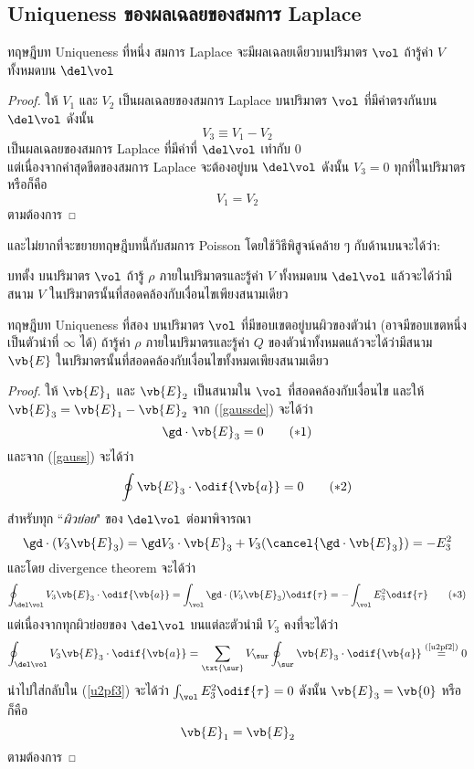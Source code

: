 \subsection{Uniqueness ของผลเฉลยของสมการ Laplace}
\begin{lawbox}{ทฤษฎีบท Uniqueness ที่หนึ่ง}
    สมการ Laplace จะมีผลเฉลยเดียวบนปริมาตร $\vol$ ถ้ารู้ค่า $V$ ทั้งหมดบน $\del\vol$
\end{lawbox}
\begin{proof}
    ให้ $V_1$ และ $V_2$ เป็นผลเฉลยของสมการ Laplace บนปริมาตร $\vol$ ที่มีค่าตรงกันบน $\del\vol$ ดังนั้น
    \[
    V_3\equiv V_1-V_2
    \]
    เป็นผลเฉลยของสมการ Laplace ที่มีค่าที่ $\del\vol$ เท่ากับ $0$\\
    แต่เนื่องจากค่าสุดขีดของสมการ Laplace จะต้องอยู่บน $\del\vol$ ดังนั้น $V_3=0$ ทุกที่ในปริมาตร หรือก็คือ
    \[
    V_1=V_2
    \]
    ตามต้องการ
\end{proof}
และไม่ยากที่จะขยายทฤษฎีบทนี้กับสมการ Poisson โดยใช้วิธีพิสูจน์คล้าย ๆ กับด้านบนจะได้ว่า:
\begin{corbox}{บทตั้ง}
    บนปริมาตร $\vol$ ถ้ารู้ $\rho$ ภายในปริมาตรและรู้ค่า $V$ ทั้งหมดบน $\del\vol$ แล้วจะได้ว่ามีสนาม $V$ ในปริมาตรนั้นที่สอดคล้องกับเงื่อนไขเพียงสนามเดียว
\end{corbox}

\begin{lawbox}{ทฤษฎีบท Uniqueness ที่สอง}
    บนปริมาตร $\vol$ ที่มีขอบเขตอยู่บนผิวของตัวนำ (อาจมีขอบเขตหนึ่งเป็นตัวนำที่ $\infty$ ได้) ถ้ารู้ค่า $\rho$ ภายในปริมาตรและรู้ค่า $Q$ ของตัวนำทั้งหมดแล้วจะได้ว่ามีสนาม $\vb{E}$ ในปริมาตรนั้นที่สอดคล้องกับเงื่อนไขทั้งหมดเพียงสนามเดียว
\end{lawbox}
\begin{proof}
    ให้ $\vb{E}_1$ และ $\vb{E}_2$ เป็นสนามใน $\vol$ ที่สอดคล้องกับเงื่อนไข และให้ $\vb{E}_3=\vb{E}_1-\vb{E}_2$ จาก (\ref{gaussde}) จะได้ว่า
    \begin{equation}
        \gd\cdot\vb{E}_3=0\tag{$*$1}
    \end{equation}
    และจาก (\ref{gauss}) จะได้ว่า
    \begin{equation}
        \oint\vb{E}_3\cdot\odif{\vb{a}}=0\tag{$*$2}\label{u2pf2}
    \end{equation}
    สำหรับทุก ``\emph{ผิวย่อย}" ของ $\del\vol$ ต่อมาพิจารณา
    \[
    \gd\cdot(V_3\vb{E}_3)=\gd V_3\cdot\vb{E}_3+V_3(\cancel{\gd\cdot\vb{E}_3})=-E_3^2
    \]
    และโดย divergence theorem จะได้ว่า
    \begin{equation}
    \oint_{\del\vol}V_3\vb{E}_3\cdot\odif{\vb{a}}=\int_\vol\gd\cdot(V_3\vb{E}_3)\odif{\tau}=-\int_\vol E_3^2\odif{\tau}\tag{$*$3}\label{u2pf3}
    \end{equation}
    แต่เนื่องจากทุกผิวย่อยของ $\del\vol$ บนแต่ละตัวนำมี $V_3$ คงที่จะได้ว่า
    \[
    \oint_{\del\vol}V_3\vb{E}_3\cdot\odif{\vb{a}}=\sum_{\txt{\sur}}V_\sur\oint_\sur\vb{E}_3\cdot\odif{\vb{a}}\overset{\text{(\ref{u2pf2})}}{=}0
    \]
    นำไปใส่กลับใน (\ref{u2pf3}) จะได้ว่า $\int_\vol E_3^2\odif{\tau}=0$ ดังนั้น $\vb{E}_3=\vb{0}$ หรือก็คือ
    \[
    \vb{E}_1=\vb{E}_2
    \]
    ตามต้องการ
\end{proof}

